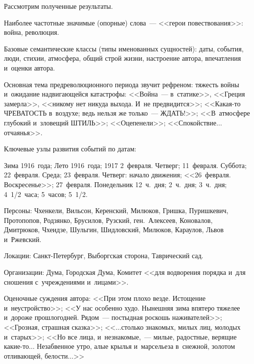 \begin{multicols}{2}
     Рассмотрим полученные результаты.
     
     Наиболее частотные значимые (опорные) слова~--- <<герои 
повествования>>: война, революция.
     
     Базовые семантические классы (типы именованных сущностей): даты, 
события, люди, стихии, атмосфера, общий строй жизни, настроение автора, 
впечатления и~оценки автора.
     
     Основная тема предреволюционного периода звучит рефреном: тяжесть 
войны и~ожидание надвигающейся катастрофы: <<Война~--- в~статике>>, 
<<Греция замерла>>, <<никому нет никуда выхода. И~не предвидится>>; 
<<Ка\-кая-то ЧРЕВАТОСТЬ в~воздухе; ведь нельзя же только~--- 
ЖДАТЬ!>>; <<В~атмосфере глубокий и~зловещий ШТИЛЬ>>; 
<<Оцепенели>>; <<Спокойствие$\ldots$ отчаянья>>.
     
     Ключевые узлы развития событий по датам:
     
     Зима 1916~года; Лето 1916~года; 1917 2~февраля. Четверг; 11~февраля. 
Суббота; 22~февраля. Среда; 23~февраля. Четверг: начало движения; 
<<26~февраля. Воскресенье>>; 27~февраля. Понедельник 12~ч.\ дня; 2~ч.\ 
дня; 3~ч.\ дня; 4~1/2~часа; 5~часов; 5~1/2.
     
     Персоны: Чхенкели, Вильсон, Керенский, Милюков, Гришка, 
Пуришкевич, Протопопов, Род\-зян\-ко, Брусилов, Рузский, ген.\ Алексеев, 
Коновалов, Дмитрюков, Чхеидзе, Шульгин, Шидловский, Милюков, 
Караулов, Львов и~Ржевский.
     
     Локации: Санкт-Петербург, Выборгская сторона, Таврический сад.
     
     Организации: Дума, Городская Дума, Комитет <<для водворения 
порядка и~для сношения с~учреж\-де\-ни\-ями и~лицами>>.
     
     Оценочные суждения автора: <<При этом плохо везде. Истощение 
и~неустройство>>; <<У нас особенно худо. Нынешняя зима впятеро тяжелее 
и~дороже прошлогодней. Рядом~--- постыдная роскошь наживателей>>; 
<<Грозная, страш\-ная сказка>>; <<$\ldots$столько знакомых, милых лиц, 
молодых и~старых>>; <<Но все лица, и~незнакомые,~--- милые, радостные, 
верящие ка\-кие-то$\ldots$ Незабвенное утро, алые \mbox{крылья} и~марсельеза 
в~снежной, золотом отливающей, белости$\ldots$>>
     

\end{multicols}
